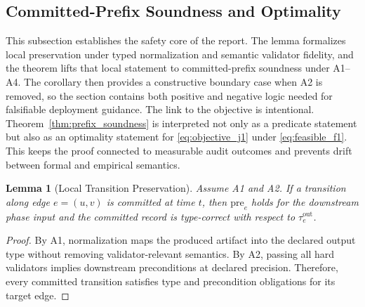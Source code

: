 \documentclass{article} %
\newtheorem{lemma}[theorem]{Lemma}
\begin{document}
\subsection{Committed-Prefix Soundness and Optimality}
This subsection establishes the safety core of the report. The lemma formalizes local preservation under typed normalization and semantic validator fidelity, and the theorem lifts that local statement to committed-prefix soundness under A1--A4. The corollary then provides a constructive boundary case when A2 is removed, so the section contains both positive and negative logic needed for falsifiable deployment guidance.
The link to the objective is intentional. Theorem~\ref{thm:prefix_soundness} is interpreted not only as a predicate statement but also as an optimality statement for \eqref{eq:objective_j1} under \eqref{eq:feasible_f1}. This keeps the proof connected to measurable audit outcomes and prevents drift between formal and empirical semantics.
\begin{lemma}[Local Transition Preservation]
\label{lem:local_preservation}
Assume A1 and A2. If a transition along edge $e=(u,v)$ is committed at time $t$, then $\mathrm{pre}_e$ holds for the downstream phase input and the committed record is type-correct with respect to $\tau^{\mathrm{out}}_e$.
\end{lemma}
\begin{proof}
By A1, normalization maps the produced artifact into the declared output type without removing validator-relevant semantics. By A2, passing all hard validators implies downstream preconditions at declared precision. Therefore, every committed transition satisfies type and precondition obligations for its target edge.\qedhere
\end{proof}
\end{document}
